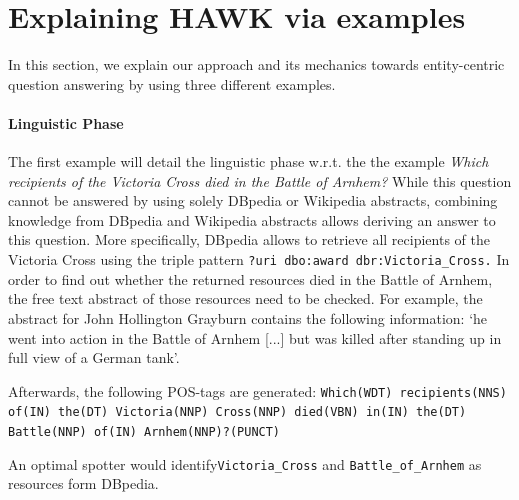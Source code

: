 \section{Explaining HAWK via examples}
\label{sec:hawkexample}
In this section, we explain our approach and its mechanics towards entity-centric question answering by using three different  examples. 

\paragraph{Linguistic Phase} The first example will detail the linguistic phase w.r.t. the the  example \emph{Which recipients of the Victoria Cross died in the Battle of Arnhem?}
While this question cannot be answered by using solely DBpedia or Wikipedia abstracts, combining knowledge from DBpedia and Wikipedia abstracts allows deriving an answer to this question.
 More specifically, DBpedia allows to retrieve all recipients of the Victoria Cross using the triple pattern \texttt{?uri dbo:award dbr:Victoria\_Cross.}
In order to find out whether the returned resources died in the Battle of Arnhem, the free text abstract of those resources need to be checked. 
For example, the abstract for John Hollington Grayburn contains the following information: 
`he went into action in the Battle of Arnhem [...] but was killed after standing up in full view of a German tank'. 

Afterwards, the following POS-tags are generated:
\texttt{Which(WDT) recipients(NNS) of(IN) the(DT) Victoria(NNP) Cross(NNP) died(VBN) in(IN) the(DT) \\Battle(NNP) of(IN) Arnhem(NNP)?(PUNCT)}

An optimal spotter would identify\texttt{Victoria\_Cross} and \texttt{Battle\_of\_Arnhem} as resources form DBpedia.


